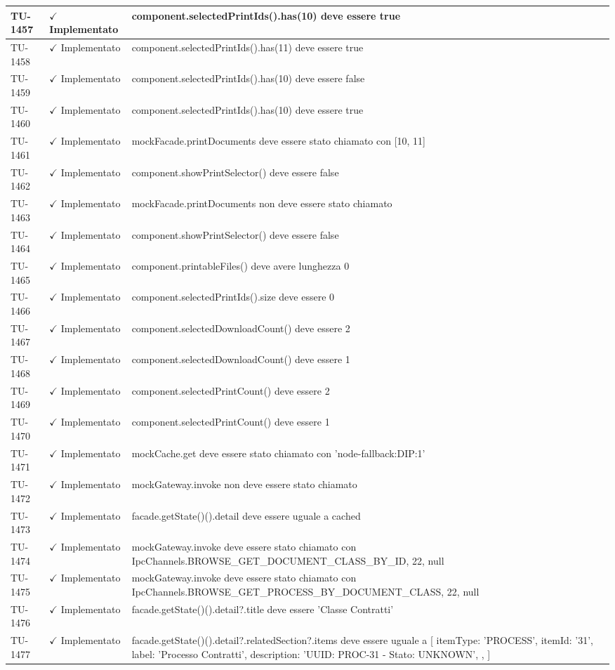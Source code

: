 ﻿\documentclass[a4paper,12pt]{article}
\newcommand{\ok}{\textcolor{green!60!black}{$\checkmark$ Implementato}}
\begin{document}
\begin{longtable}{|p{2cm}|p{3.5cm}|p{9.5cm}|}
\hline
TU-1457 & \ok & component.selectedPrintIds().has(10) deve essere true \\
\hline
TU-1458 & \ok & component.selectedPrintIds().has(11) deve essere true \\
\hline
TU-1459 & \ok & component.selectedPrintIds().has(10) deve essere false \\
\hline
TU-1460 & \ok & component.selectedPrintIds().has(10) deve essere true \\
\hline
TU-1461 & \ok & mockFacade.printDocuments deve essere stato chiamato con [10, 11] \\
\hline
TU-1462 & \ok & component.showPrintSelector() deve essere false \\
\hline
TU-1463 & \ok & mockFacade.printDocuments non deve essere stato chiamato \\
\hline
TU-1464 & \ok & component.showPrintSelector() deve essere false \\
\hline
TU-1465 & \ok & component.printableFiles() deve avere lunghezza 0 \\
\hline
TU-1466 & \ok & component.selectedPrintIds().size deve essere 0 \\
\hline
TU-1467 & \ok & component.selectedDownloadCount() deve essere 2 \\
\hline
TU-1468 & \ok & component.selectedDownloadCount() deve essere 1 \\
\hline
TU-1469 & \ok & component.selectedPrintCount() deve essere 2 \\
\hline
TU-1470 & \ok & component.selectedPrintCount() deve essere 1 \\
\hline
TU-1471 & \ok & mockCache.get deve essere stato chiamato con 'node-fallback:DIP:1' \\
\hline
TU-1472 & \ok & mockGateway.invoke non deve essere stato chiamato \\
\hline
TU-1473 & \ok & facade.getState()().detail deve essere uguale a cached \\
\hline
TU-1474 & \ok & mockGateway.invoke deve essere stato chiamato con IpcChannels.BROWSE\_GET\_DOCUMENT\_CLASS\_BY\_ID, 22, null \\
\hline
TU-1475 & \ok & mockGateway.invoke deve essere stato chiamato con IpcChannels.BROWSE\_GET\_PROCESS\_BY\_DOCUMENT\_CLASS, 22, null \\
\hline
TU-1476 & \ok & facade.getState()().detail?.title deve essere 'Classe Contratti' \\
\hline
TU-1477 & \ok & facade.getState()().detail?.relatedSection?.items deve essere uguale a [ { itemType: 'PROCESS', itemId: '31', label: 'Processo Contratti', description: 'UUID: PROC-31 - Stato: UNKNOWN', }, ] \\

\end{longtable}
\end{document}
